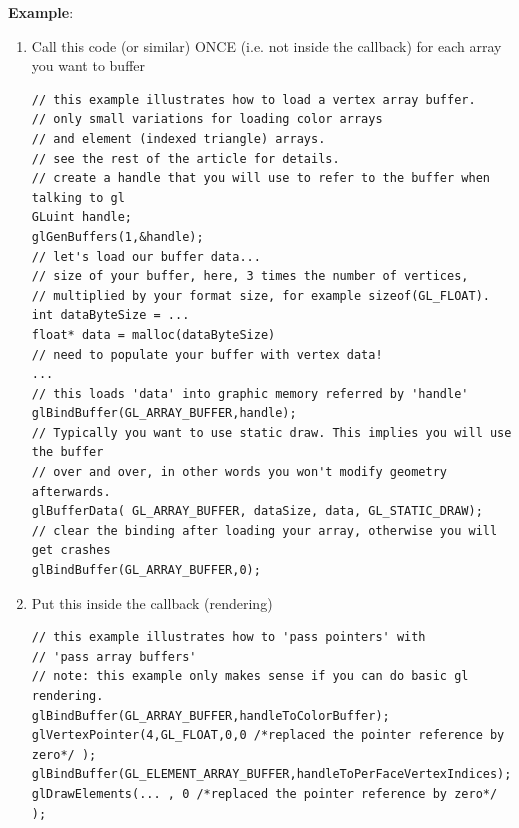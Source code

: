 {\bf Example}:
\begin{enumerate}
\item Call this code (or similar) ONCE (i.e. not inside the callback)
  for each array you want to buffer
\begin{verbatim}
// this example illustrates how to load a vertex array buffer.
// only small variations for loading color arrays
// and element (indexed triangle) arrays.
// see the rest of the article for details.
// create a handle that you will use to refer to the buffer when talking to gl
GLuint handle;
glGenBuffers(1,&handle);
// let's load our buffer data...
// size of your buffer, here, 3 times the number of vertices,
// multiplied by your format size, for example sizeof(GL_FLOAT).
int dataByteSize = ...
float* data = malloc(dataByteSize)
// need to populate your buffer with vertex data!
...
// this loads 'data' into graphic memory referred by 'handle'
glBindBuffer(GL_ARRAY_BUFFER,handle);
// Typically you want to use static draw. This implies you will use the buffer
// over and over, in other words you won't modify geometry afterwards.
glBufferData( GL_ARRAY_BUFFER, dataSize, data, GL_STATIC_DRAW);
// clear the binding after loading your array, otherwise you will get crashes
glBindBuffer(GL_ARRAY_BUFFER,0);
\end{verbatim}

\item Put this inside the callback (rendering)
\begin{verbatim}
// this example illustrates how to 'pass pointers' with
// 'pass array buffers'
// note: this example only makes sense if you can do basic gl rendering.
glBindBuffer(GL_ARRAY_BUFFER,handleToColorBuffer);
glVertexPointer(4,GL_FLOAT,0,0 /*replaced the pointer reference by zero*/ );
glBindBuffer(GL_ELEMENT_ARRAY_BUFFER,handleToPerFaceVertexIndices);
glDrawElements(... , 0 /*replaced the pointer reference by zero*/ );
\end{verbatim}

\end{enumerate}


